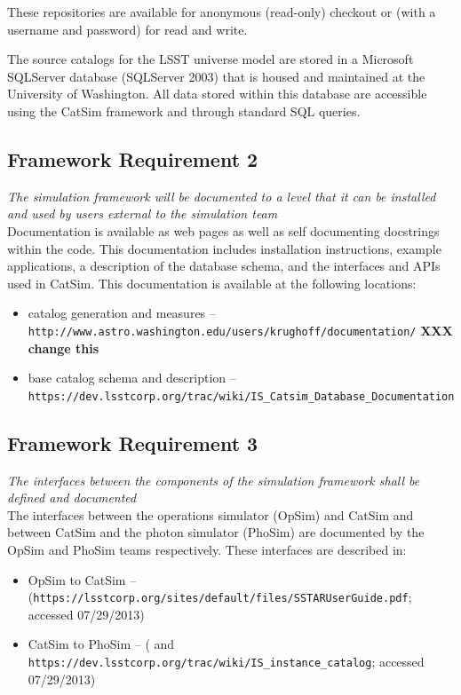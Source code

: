 \documentclass[11pt]{article}
\begin{document}
These repositories are available for anonymous (read-only) checkout or
(with a username and password) for read and write.

The source catalogs for the LSST universe model are stored in a
Microsoft SQLServer database (SQLServer 2003) that is housed and
maintained at the University of Washington. All data stored within
this database are accessible using the CatSim framework and through
standard SQL queries.

\subsection{Framework Requirement 2}

{\it The simulation framework will be documented to a level
  that it can be installed and used by users external to the
  simulation team}\\

Documentation is available as web pages as well as self documenting
docstrings within the code.  This documentation includes installation
instructions, example applications, a description of the database
schema, and the interfaces and APIs used in CatSim. This documentation
is available at the following locations:
\begin{itemize}
\item catalog generation and measures -- {\tt http://www.astro.washington.edu/users/krughoff/documentation/}
{\bf XXX change this}

\item base catalog schema and description -- {\tt https://dev.lsstcorp.org/trac/wiki/IS\_Catsim\_Database\_Documentation}
\end{itemize}


\subsection{Framework Requirement 3}

{\it  The interfaces between the components of the simulation framework shall be defined 
and documented}\\

The interfaces between the operations simulator (OpSim) and CatSim and
between CatSim and the photon simulator (PhoSim) are documented by the
OpSim and PhoSim teams respectively.  These interfaces are described in:
\begin{itemize}
\item OpSim to CatSim -- ({\tt https://lsstcorp.org/sites/default/files/SSTARUserGuide.pdf}; accessed 07/29/2013)
\item CatSim to PhoSim -- (\citet{phosim} and {\tt https://dev.lsstcorp.org/trac/wiki/IS\_instance\_catalog}; accessed 07/29/2013)
\end{itemize}
\end{document}
